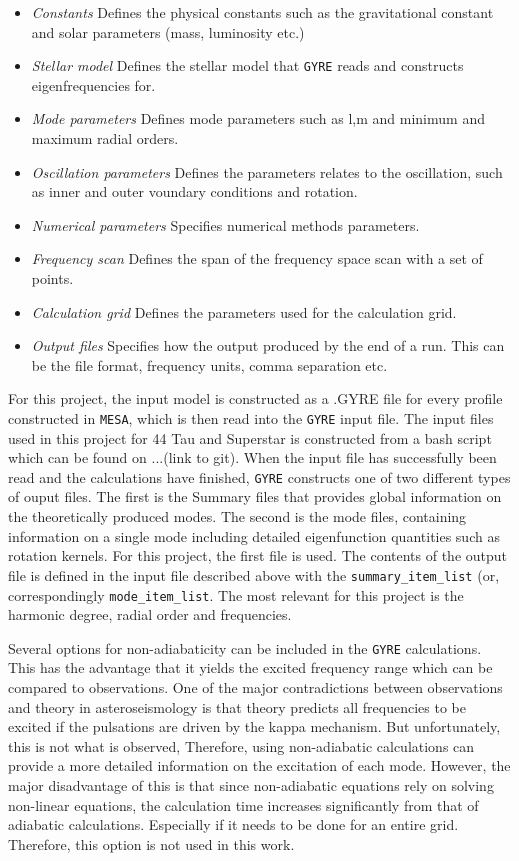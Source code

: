 \begin{itemize}
    \item \emph{Constants} Defines the physical constants such as the gravitational constant and solar parameters (mass, luminosity etc.)
    \item \emph{Stellar model} Defines the stellar model that \texttt{GYRE} reads and constructs eigenfrequencies for. 
    \item \emph{Mode parameters} Defines mode parameters such as l,m and minimum and maximum radial orders. 
    \item \emph{Oscillation parameters} Defines the parameters relates to the oscillation, such as inner and outer voundary conditions and rotation. 
    \item \emph{Numerical parameters} Specifies numerical methods parameters. 
    \item \emph{Frequency scan} Defines the span of the frequency space scan with a set of points. 
    \item \emph{Calculation grid} Defines the parameters used for the calculation grid. 
    \item \emph{Output files} Specifies how the output produced by the end of a run. This can be the file format, frequency units, comma separation etc.  
\end{itemize}

For this project, the input model is constructed as a .GYRE file for every profile constructed in \texttt{MESA}, which is then read into the \texttt{GYRE} input file. The input files used in this project for 44 Tau and Superstar is constructed from a bash script which can be found on ...(link to git). When the input file has successfully been read and the calculations have finished, \texttt{GYRE} constructs one of two different types of ouput files. The first is the Summary files that provides global information on the theoretically produced modes. The second is the mode files, containing information on a single mode including detailed eigenfunction quantities such as rotation kernels. For this project, the first file is used. The contents of the output file is defined in the input file described above with the \texttt{summary\_item\_list} (or, correspondingly \texttt{mode\_item\_list}. The most relevant for this project is the harmonic degree, radial order and frequencies. 

Several options for non-adiabaticity can be included in the \texttt{GYRE} calculations. This has the advantage that it yields the excited frequency range which can be compared to observations. One of the major contradictions between observations and theory in asteroseismology is that theory predicts all frequencies to be excited if the pulsations are driven by the kappa mechanism. But unfortunately, this is not what is observed, Therefore, using non-adiabatic calculations can provide a more detailed information on the excitation of each mode. However, the major disadvantage of this is that since non-adiabatic equations rely on solving non-linear equations, the calculation time increases significantly from that of adiabatic calculations. Especially if it needs to be done for an entire grid. Therefore, this option is not used in this work.  